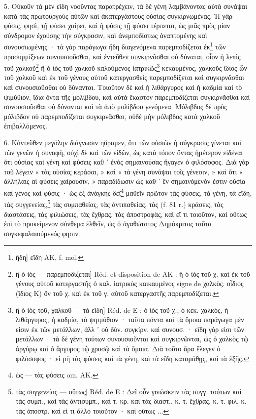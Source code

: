 \documentclass[a4paper, 11pt, oneside, polutonikogreek, french]{article}
\begin{document}
5. Οὐκοῦν τὰ μὲν εἴδη νοοῦντας παρατρέχειν, τὰ δὲ γένη λαμβάνοντας αὐτὰ συνάψαι κατὰ τὰς πρωτουργοὺς αὐτῶν καὶ ἀκατεργάστους οὐσίας συγκιρνωμένας. Ἡ γὰρ φύσις, φησὶ, τῇ φύσει χαίρει, καὶ ἡ φύσις τῇ φύσει τέρπεται, ὡς μιᾶς πρὸς μίαν σύνδρομον ἐχούσης τὴν σύγκρασιν, καὶ ἀνεμποδίστως ἀναπτομένης καὶ συνουσιωμένης · τὰ γὰρ παράγωγα ἤδη διαγενόμενα παρεμποδίζεται ἐκ\footnote{ἤδη] εἴδη AK, f. mel.} τῶν προσυμμίξεων συνουσιοῦσθαι, καὶ ἐντεῦθεν συνκιρνᾶσθαι οὐ δύναται, οἷον ἡ λεπὶς τοῦ χαλκοῦ\footnote{ἢ ὁ ἰὸς --- παρεμποδίζεται] Réd. et disposition de AK : ἢ ὁ ἰὸς τοῦ χ. καὶ ἐκ τοῦ γένους αὐτοῦ κατεργαστῆς ὁ καλ. ἰατρικὸς καικαυμένος signe de χαλκὸς. οἶδιος (ἴδιος K) ὂν τοῦ χ. καὶ ἐκ τοῦ γ. αὐτοῦ κατεργαστῆς παρεμποδίζεται.} ἢ ὁ ἰὸς τοῦ χαλκοῦ καλούμενος ἰατρικῶς\footnote{ἢ ὁ ἰὸς τοῦ, χαλκοῦ --- τὰ εἴδη] Réd. de E : ὁ ἰὸς τοῦ χ., ὁ κεκ. χαλκὸς, ἡ λιθάργυρος, ἡ καδμία, τὸ ψιμμύθιον · ταῦτα πάντα καὶ τὰ ὅμοια παράγωγα μέν εἰσιν ἐκ τῶν μετάλλων, ἀλλ ᾽ οὐ δύν. συγκίρν. καὶ συνουσ. · εἴδη γάρ εἰσι τῶν μετάλλων · τὰ δὲ γένη τούτων συνουσιοῦνται καὶ συγκιρνῶνται, ὡς ὁ χαλκὸς τῷ ἀργύρῳ καὶ ὁ ἄργυρος τῷ χρυσῷ καὶ τὰ ὅμοια. Διὰ τοῦτο ἄρα ἔλεγεν ὁ φιλόσοφος · εἰ μὴ τὰς φύσεις καὶ τὰ γένη, καὶ τὰ εἴδη καταμάθῃς, καὶ τὰ ἑξῆς.} κεκαυμένος, χαλκοῦς ἴδιος ὦν τοῦ χαλκοῦ καὶ ἐκ τοῦ γένους αὐτοῦ κατεργασθεὶς παρεμποδίζεται καὶ συγκιρνᾶσθαι καὶ συνουσιοῦσθαι οὐ δύνανται. Τοιοῦτον δὲ καὶ ἡ λιθάργυρος καὶ ἡ καδμία καὶ τὸ ψιμύθιον, ἴδια ὄντα τῆς μολίβδου, καὶ αὐτὰ ἕκαστον παρεμποδίζεται συγκιρνᾶσθαι καὶ συνουσιοῦσθαι οὐ δύνανται καὶ τὰ ἀπὸ μολίβδου γενόμενα. Μόλιβδος δὲ πρὸς μόλιβδον οὐ παρεμποδίζεται συγκιρνᾶσθαι, οὐδὲ μὴν μόλιβδος κατὰ χαλκοῦ ἐπιβαλλόμενος.

6. Κἀντεῦθεν μεγάλην διάγνωσιν ηὕραμεν, ὅτι τῶν οὐσιῶν ἡ σύγκρασις γίνεται καὶ τῶν γενῶν ἡ συναφὴ, οὐχὶ δὲ καὶ τῶν εἰδῶν, ὡς κατὰ τόπον ὄντας ἡμέτερον εἰδέναι ὅτι οὐσίας καὶ γένη καὶ φύσεις καθ ᾽ ἑνὸς σημαινούσας ἤγαγεν ὁ φιλόσοφος. Διὰ γὰρ τοῦ λέγειν « τὰς οὐσίας κεράσαι, » καὶ « τὰ γένη συνάψαι τοῖς γένεσιν, » καὶ ὅτι « ἀλλήλαις αἱ φύσεις χαίρουσιν, » παραδίδωσιν ὡς καθ ᾽ ἓν σημαινόμενόν ἐστιν οὐσία καὶ γένος καὶ φύσις · ὡς ἐξ ἀνάγκης δεῖ\footnote{ὡς --- τὰς φύσεις om. AK.} μαθεῖν πρῶτον τὰς φύσεις, τὰ γένη, τὰ εἴδη, τὰς συγγενείας,\footnote{τὰς συγγενείας --- οὕτως] Réd. de E : Δεῖ οὖν γινώσκειν τὰς συγγ. τούτων καὶ τὰς συμπ., καὶ τὰς ἀντισυμπ., καὶ τ. κρ. καὶ τὰς διαστ., κ. τ. ἔχθρας, κ. τ. φιλ. κ. τὰς ἀποστρ. καὶ εἰ τι ἄλλο τοιοῦτον · καὶ οὕτως ...} τὰς συμπαθείας, τὰς ἀντιπαθείας, τὰς (f. 81 r.) κράσεις, τὰς διαστάσεις, τὰς φιλιώσεις, τὰς ἔχθρας, τὰς ἀποστροφὰς, καὶ εἴ τι τοιοῦτον, καὶ οὕτως ἐπὶ τὸ προκείμενον σύνθεμα ἐλθεῖν, ὡς ὁ ἀγαθώτατος Δημόκριτος ταῦτα συγκεφαλαιούμενός φησιν.
\end{document}
